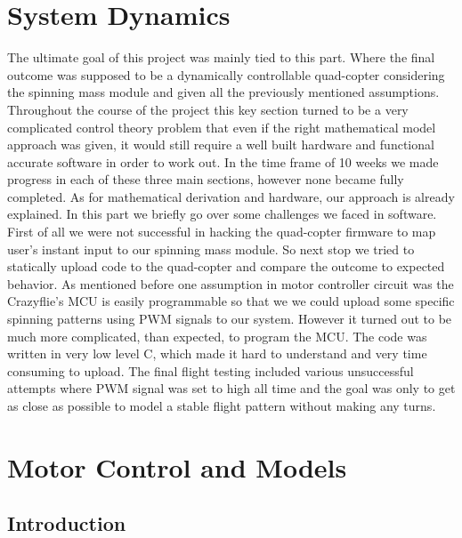 \section{System Dynamics}
The ultimate goal of this project was mainly tied to  this part. Where the final outcome was supposed to be a dynamically controllable quad-copter considering the spinning mass module and given all the previously mentioned assumptions. 
\newline Throughout the course of the project this key section turned to be a very complicated control theory problem that even if the right mathematical model approach was given, it would still require a well built hardware and functional accurate software in order to work out. 
In the time frame of 10 weeks we made progress in each of these three main sections, however none became fully completed. As for mathematical derivation and hardware, our approach is already explained. In this part we briefly go over some challenges we faced in software. 
\newline First of all we were not successful in hacking the quad-copter firmware to map user's instant input to our spinning mass module. So next stop we tried to statically upload code to the quad-copter and compare the outcome to expected behavior. As mentioned before one assumption in motor controller circuit was the Crazyflie's MCU is easily programmable so that we we could upload some specific spinning patterns using PWM signals to our system. However it turned out to be much more complicated, than expected, to program the MCU. The code was written in very low level C, which made it hard to understand and very time consuming to upload.
\newline The final flight testing included various unsuccessful attempts where PWM signal was set to high all time and the goal was only to get as close as possible to model a stable flight pattern without making any turns.    
 
\section{Motor Control and Models}
\subsection{Introduction}
